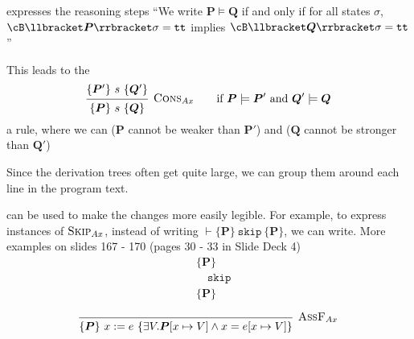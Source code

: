  expresses the reasoning steps
``We write $\bm{P} \models \bm{Q}$ if and only if for all states $\sigma$,
$\cB \llbracket \bm{P} \rrbracket \sigma = \texttt{tt}$ implies $\cB \llbracket \bm{Q} \rrbracket \sigma = \texttt{tt}$''

This leads to the 
\[
    \begin{prooftree}
        \hypo{\{ \bm{P}' \} \ s \ \{ \bm{Q}' \}}
        \infer1[$\textsc{Cons}_{Ax}$]{\{ \bm{P} \} \ s \ \{ \bm{Q} \}}
    \end{prooftree}
    \qquad
    \text{if } \bm{P} \models \bm{P}' \text{ and } \bm{Q}' \models \bm{Q}
\]
a rule, where we can  ($\bm{P}$ cannot be weaker than $\bm{P}'$) and  ($\bm{Q}$ cannot be stronger than $\bm{Q}'$)

Since the derivation trees often get quite large, we can group them around each line in the program text.

 can be used to make the changes more easily legible.
For example, to express instances of $\textsc{Skip}_{Ax}$, instead of writing $\vdash \{ \bm{P} \} \ \texttt{skip} \ \{ \bm{P} \}$, we can write. 
More examples on slides 167 - 170 (pages 30 - 33 in Slide Deck 4)
\rmvspace
\begin{align*}
     & \{ \bm{P} \}        \\
     & \quad \texttt{skip} \\
     & \{ \bm{P} \}
\end{align*}

\[
    \begin{prooftree}
        \infer0[$\textsc{AssF}_{Ax}$]{\{ \bm{P} \} \ x := e \ \{ \exists V. \bm{P}[x \mapsto V] \land x = e[x \mapsto V] \}}
    \end{prooftree}
\]
